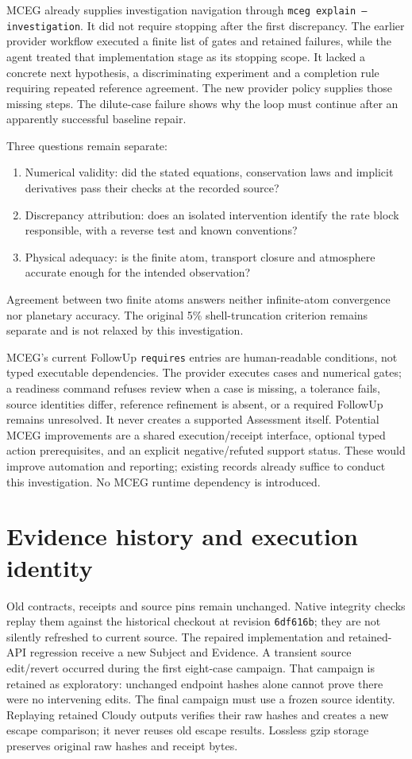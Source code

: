 \documentclass[11pt,a4paper]{article}
\begin{document}
MCEG already supplies investigation navigation through
\texttt{mceg explain --investigation}. It did not require stopping after the
first discrepancy. The earlier provider workflow executed a finite list of
gates and retained failures, while the agent treated that implementation stage
as its stopping scope. It lacked a concrete next hypothesis, a discriminating
experiment and a completion rule requiring repeated reference agreement.
The new provider policy supplies those missing steps. The dilute-case failure
shows why the loop must continue after an apparently successful baseline repair.

Three questions remain separate:
\begin{enumerate}
\item Numerical validity: did the stated equations, conservation laws and
implicit derivatives pass their checks at the recorded source?
\item Discrepancy attribution: does an isolated intervention identify the
rate block responsible, with a reverse test and known conventions?
\item Physical adequacy: is the finite atom, transport closure and atmosphere
accurate enough for the intended observation?
\end{enumerate}
Agreement between two finite atoms answers neither infinite-atom convergence
nor planetary accuracy. The original 5\% shell-truncation criterion remains
separate and is not relaxed by this investigation.

MCEG's current FollowUp \texttt{requires} entries are human-readable conditions,
not typed executable dependencies. The provider executes cases and numerical
gates; a readiness command refuses review when a case is missing, a tolerance
fails, source identities differ, reference refinement is absent, or a required
FollowUp remains unresolved. It never creates a supported Assessment itself.
Potential MCEG improvements are a shared execution/receipt interface, optional
typed action prerequisites, and an explicit negative/refuted support status.
These would improve automation and reporting; existing records already suffice
to conduct this investigation. No MCEG runtime dependency is introduced.

\section{Evidence history and execution identity}
Old contracts, receipts and source pins remain unchanged. Native integrity
checks replay them against the historical checkout at revision
\texttt{6df616b}; they are not silently refreshed to current source. The repaired
implementation and retained-API regression receive a new Subject and Evidence.
A transient source edit/revert occurred during the first eight-case campaign.
That campaign is retained as exploratory: unchanged endpoint hashes alone
cannot prove there were no intervening edits. The final campaign must use a
frozen source identity. Replaying retained Cloudy outputs verifies their raw
hashes and creates a new escape comparison; it never reuses old escape results.
Lossless gzip storage preserves original raw hashes and receipt bytes.
\end{document}
